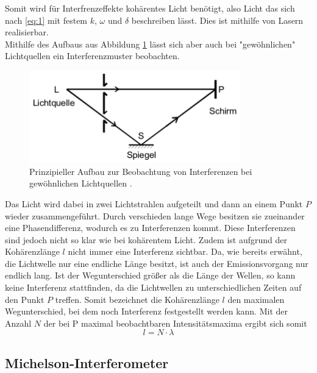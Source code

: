 Somit wird für Interfrenzeffekte kohärentes Licht benötigt, also Licht das sich nach \ref{eq:1} mit festem $k$, $\omega$ und $\delta$ beschreiben lässt. Dies ist mithilfe von Lasern realisierbar. \\
Mithilfe des Aufbaus aus Abbildung \ref{fig:Prinzip} lässt sich aber auch bei "gewöhnlichen" Lichtquellen ein Interferenzmuster beobachten.
\begin{figure}
    \centering
    \includegraphics[height=4cm]{Theorie/Prinzip.pdf}
    \caption{Prinzipieller Aufbau zur Beobachtung von Interferenzen bei gewöhnlichen Lichtquellen \cite{V401}.}
    \label{fig:Prinzip}
\end{figure}
Das Licht wird dabei in zwei Lichtstrahlen aufgeteilt und dann an einem Punkt $P$ wieder zusammengeführt. Durch verschieden lange Wege besitzen sie zueinander eine Phasendifferenz, wodurch es zu Interferenzen kommt. Diese Interferenzen sind jedoch nicht so klar wie bei kohärentem Licht. Zudem ist aufgrund der Kohärenzlänge $l$ nicht immer eine Interferenz sichtbar. Da, wie bereits erwähnt, die Lichtwelle nur eine endliche Länge besitzt, ist auch der Emissionsvorgang nur endlich lang. Ist der Wegunterschied größer als die Länge der Wellen, so kann keine Interferenz stattfinden, da die Lichtwellen zu unterschiedlichen Zeiten auf den Punkt $P$ treffen. Somit bezeichnet die Kohärenzlänge $l$ den maximalen Wegunterschied, bei dem noch Interferenz festgestellt werden kann. Mit der Anzahl $N$ der bei P maximal beobachtbaren Intensitätsmaxima ergibt sich somit
\begin{equation}
\label{eq:4}
	l = N\cdot \lambda
\end{equation}

\subsection{Michelson-Interferometer}

